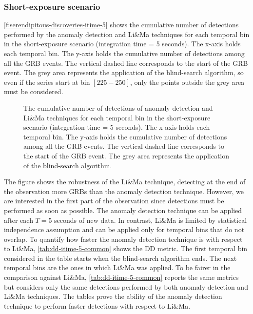 \FloatBarrier
\subsubsection{Short-exposure scenario}
\label{s:Serendipitous-Discoveries-Results-Short-Term}
\autoref{f:serendipitous-discoveries-itime-5} shows the cumulative number of detections performed by the anomaly detection and Li\&Ma techniques for each temporal bin in the short-exposure scenario (integration time = 5 seconds). The x-axis holds each temporal bin. The y-axis holds the cumulative number of detections among all the GRB events.  The vertical dashed line corresponds to the start of the GRB event. The grey area represents the application of the blind-search algorithm, so even if the series start at bin $[225-250]$, only the points outside the grey area must be considered.
\begin{figure}[!ht]
\centering

\captionsetup{width=0.9\linewidth}
\caption{The cumulative number of detections of anomaly detection and Li\&Ma techniques for each temporal bin in the short-exposure scenario (integration time = 5 seconds). The x-axis holds each temporal bin. The y-axis holds the cumulative number of detections among all the GRB events. The vertical dashed line corresponds to the start of the GRB event. The grey area represents the application of the blind-search algorithm.}
\label{f:serendipitous-discoveries-itime-5}
\end{figure}
The figure shows the robustness of the Li\&Ma technique, detecting at the end of the observation more GRBs than the anomaly detection technique. However, we are interested in the first part of the observation since detections must be performed as soon as possible. The anomaly detection technique can be applied after each $T=5$ seconds of new data. In contrast, Li\&Ma is limited by statistical independence assumption and can be applied only for temporal bins that do not overlap. To quantify how faster the anomaly detection technique is with respect to Li\&Ma, \autoref{tab:dd-itime-5-common} shows the DD metric. The first temporal bin considered in the table starts when the blind-search algorithm ends. The next temporal bins are the ones in which Li\&Ma was applied. To be fairer in the comparison against Li\&Ma, \autoref{tab:dd-itime-5-common} reports the same metrics but considers only the same detections performed by both anomaly detection and Li\&Ma techniques. The tables prove the ability of the anomaly detection technique to perform faster detections with respect to Li\&Ma.


